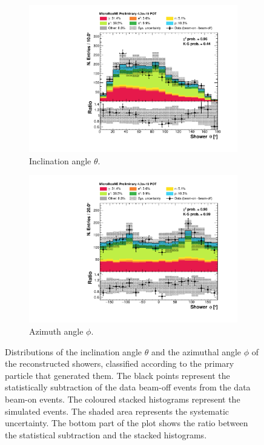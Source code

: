 \begin{figure}[htbp]
\centering
  \begin{subfigure}{0.49\textwidth}
    \includegraphics[width=\linewidth]{figures/h_shower_theta_pdg.pdf}
    \caption{Inclination angle $\theta$.}\hfill
  \end{subfigure}
    \begin{subfigure}{0.49\textwidth}
    \includegraphics[width=\linewidth]{figures/h_shower_phi_pdg.pdf}
    \caption{Azimuth angle $\phi$.} 
  \end{subfigure}
  \caption{Distributions of the inclination angle $\theta$ and the azimuthal angle $\phi$ of the reconstructed showers, classified according to the primary particle that generated them. The black points represent the statistically subtraction of the data beam-off events from the data beam-on events. The coloured stacked histograms represent the simulated events. The shaded area represents the systematic uncertainty. The bottom part of the plot shows the ratio between the statistical subtraction and the stacked histograms.}\label{fig:thetaphi_pdg}
\end{figure}

